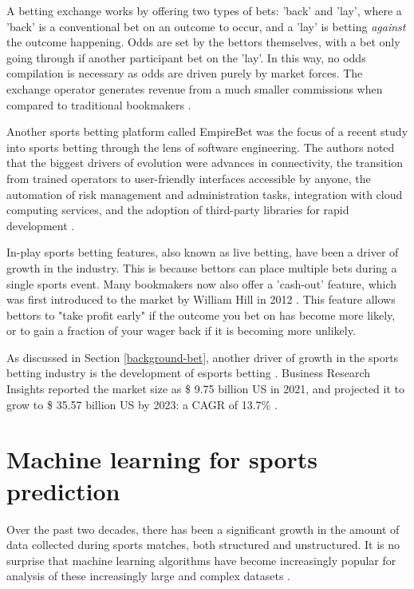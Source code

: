 A betting exchange works by offering two types of bets: 'back' and 'lay', where a 'back' is a conventional bet on an outcome to occur, and a 'lay' is betting \textit{against} the outcome happening. Odds are set by the bettors themselves, with a bet only going through if another participant bet on the 'lay'. In this way, no odds compilation is necessary as odds are driven purely by market forces. The exchange operator generates revenue from a much smaller commissions when compared to traditional bookmakers \cite{bettingexchange}.

Another sports betting platform called EmpireBet was the focus of a recent study into sports betting through the lens of software engineering. The authors noted that the biggest drivers of evolution were advances in connectivity, the transition from trained operators to user-friendly interfaces accessible by anyone, the automation of risk management and administration tasks, integration with cloud computing services, and the adoption of third-party libraries for rapid development \cite{empirebet}.

In-play sports betting features, also known as live betting, have been a driver of growth in the industry. This is because bettors can place multiple bets during a single sports event. Many bookmakers now also offer a 'cash-out' feature, which was first introduced to the market by William Hill in 2012 \cite{inplay}. This feature allows bettors to "take profit early" if the outcome you bet on has become more likely, or to gain a fraction of your wager back if it is becoming more unlikely.

As discussed in Section \ref{background-bet}, another driver of growth in the sports betting industry is the development of esports betting \cite{esportsgambling}. Business Research Insights reported the market size as \$ 9.75 billion US in 2021, and projected it to grow to \$ 35.57 billion US by 2023: a CAGR of 13.7\% \cite{esports-betting-market-report}.

\section{Machine learning for sports prediction}

Over the past two decades, there has been a significant growth in the amount of data collected during sports matches, both structured and unstructured. It is no surprise that machine learning algorithms have become increasingly popular for analysis of these increasingly large and complex datasets \cite{mlsports}. 

